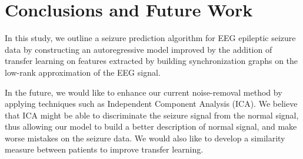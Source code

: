 \documentclass{article} %
\theoremstyle{definition}
\theoremstyle{remark}
\newcommand{\BibDir}{./bibliography}
\begin{document}
\section{Conclusions and Future Work} \label{sec:discuss}
In this study, we outline a seizure prediction algorithm for EEG epileptic seizure data by constructing an autoregressive model improved by the addition of transfer learning on features extracted by building synchronization graphs on the low-rank approximation of the EEG signal.  

In the future, we would like to enhance our current noise-removal method by applying techniques such as Independent Component Analysis (ICA).  We believe that ICA might be able to discriminate the seizure signal from the normal signal, thus allowing our model to build a better description of normal signal, and make worse mistakes on the seizure data.  We would also like to develop a similarity measure between patients to improve transfer learning.


{\small


}
\end{document}
